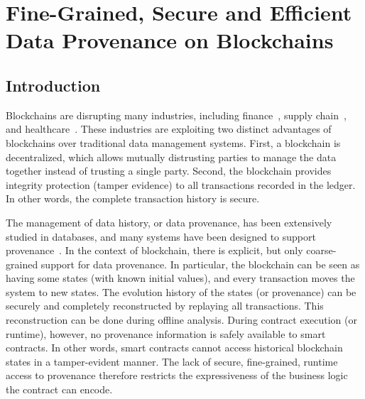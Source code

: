 \chapter{Fine-Grained, Secure and Efficient Data Provenance on Blockchains}
\label{ch:prov}

\section{Introduction}
\label{sec:provenance:intro}
Blockchains are disrupting many industries, including
finance~\cite{tapscott2017blockchain,nguyen2016blockchain}, supply
chain~\cite{korpela2017digital,tian2016agri}, and healthcare~\cite{medilot}. These industries are exploiting
two distinct advantages of blockchains over traditional data management systems. First, a blockchain is
decentralized, which allows mutually distrusting parties to manage the data together instead of trusting a
single party.  Second, the blockchain provides integrity protection (tamper evidence) to all transactions
recorded in the ledger. In other words, the complete transaction history is secure.  

The management of data history, or data provenance, has been extensively studied in databases, and  many
systems have been designed to support
provenance~\cite{cheney2009provenance,chiticariu2005dbnotes,buneman2006provenance,park2011ramp,akoush2013hadoopprov,wang2015big}.
In the context of blockchain, there is explicit, but only coarse-grained support for data provenance. In
particular, the blockchain can be seen as having some states (with known initial values), and every
transaction moves the system to new states.  The evolution history of the states (or provenance) can be
securely and completely reconstructed by replaying all transactions. This reconstruction can be done 
during offline analysis. During contract execution (or runtime), however, no provenance information is
safely available to smart contracts. In other words, smart contracts cannot access historical blockchain
states in a tamper-evident manner. The lack of secure, fine-grained, runtime access to provenance therefore restricts the expressiveness of the business logic the contract can encode.

